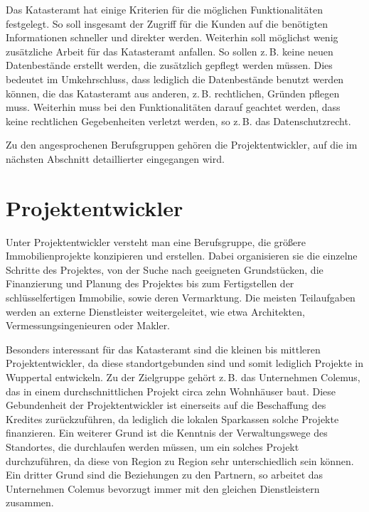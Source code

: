 Das Katasteramt hat einige Kriterien für die möglichen Funktionalitäten festgelegt.
So soll insgesamt der Zugriff für die Kunden auf die benötigten Informationen schneller und direkter werden. Weiterhin soll möglichst wenig zusätzliche Arbeit für das Katasteramt anfallen.
So sollen z.\,B. keine neuen Datenbestände erstellt werden, die zusätzlich gepflegt werden müssen. Dies bedeutet im Umkehrschluss, dass lediglich die Datenbestände benutzt werden können, die das Katasteramt aus anderen, z.\,B. rechtlichen, Gründen pflegen muss.
Weiterhin muss bei den Funktionalitäten darauf geachtet werden, dass keine rechtlichen Gegebenheiten verletzt werden, so z.\,B. das Datenschutzrecht.

Zu den angesprochenen Berufsgruppen gehören die Projektentwickler, auf die im nächsten Abschnitt detaillierter eingegangen wird.



\section{Projektentwickler}

Unter Projektentwickler versteht man eine Berufsgruppe, die größere Immobilienprojekte konzipieren und erstellen.
Dabei organisieren sie die einzelne Schritte des Projektes, von der Suche nach geeigneten Grundstücken, die Finanzierung und Planung des Projektes bis zum Fertigstellen der schlüsselfertigen Immobilie, sowie deren Vermarktung.
Die meisten Teilaufgaben werden an externe Dienstleister weitergeleitet, wie etwa Architekten, Vermessungsingenieuren oder Makler.

Besonders interessant für das Katasteramt sind die kleinen bis mittleren Projektentwickler, da diese standortgebunden sind und somit lediglich Projekte in Wuppertal entwickeln.
Zu der Zielgruppe gehört z.\,B. das Unternehmen Colemus, das in einem durchschnittlichen Projekt circa zehn Wohnhäuser baut.
Diese Gebundenheit der Projektentwickler ist einerseits auf die Beschaffung des Kredites zurückzuführen, da lediglich die lokalen Sparkassen solche Projekte finanzieren.
Ein weiterer Grund ist die Kenntnis der Verwaltungswege des Standortes, die durchlaufen werden müssen, um ein solches Projekt durchzuführen, da diese von Region zu Region sehr unterschiedlich sein können.
Ein dritter Grund sind die Beziehungen zu den Partnern, so arbeitet das Unternehmen Colemus bevorzugt immer mit den gleichen Dienstleistern zusammen.

